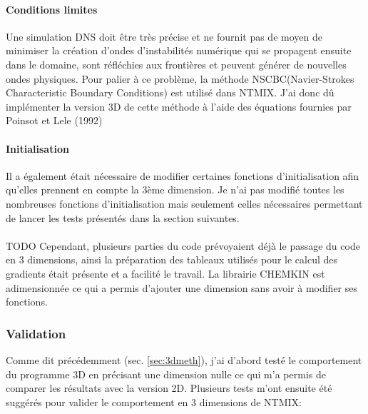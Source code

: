 \paragraph{Conditions limites}\label{sec:nsbc}
Une simulation DNS doit être très précise et ne fournit pas de moyen de minimiser la création d'ondes d'instabilités numérique qui se propagent ensuite dans le domaine, sont réfléchies aux frontières et peuvent générer de nouvelles ondes physiques\cite{baritaud1996direct}. Pour palier à ce problème, la méthode NSCBC(Navier-Strokes Characteristic Boundary Conditions) est utilisé dans NTMIX. J'ai donc dû implémenter la version 3D de cette méthode à l'aide des équations fournies par Poinsot et Lele (1992)\cite{POINSOT1992104}

\paragraph{Initialisation}Il a également était nécessaire de modifier certaines fonctions d'initialisation afin qu'elles prennent en compte la 3ème dimension. Je n'ai pas modifié toutes les nombreuses fonctions d'initialisation mais seulement  celles nécessaires permettant de lancer les tests présentés dans la section suivantes.


\paragraph{}TODO Cependant, plusieurs parties du code prévoyaient déjà le passage du code en 3 dimensions, ainsi la préparation des tableaux utilisés pour le calcul des gradients était présente et a facilité le travail. La librairie CHEMKIN est adimensionnée ce qui a permis d'ajouter une dimension sans avoir à modifier ses fonctions. 


\subsubsection{Validation}\label{sec:3D-validation}
Comme dit précédemment (sec. \ref{sec:3dmeth}), j'ai d'abord testé le comportement du programme 3D en précisant une dimension nulle ce qui m'a permis de comparer les résultats avec la version 2D. Plusieurs tests m'ont ensuite été suggérés pour valider le comportement en 3 dimensions de NTMIX:

